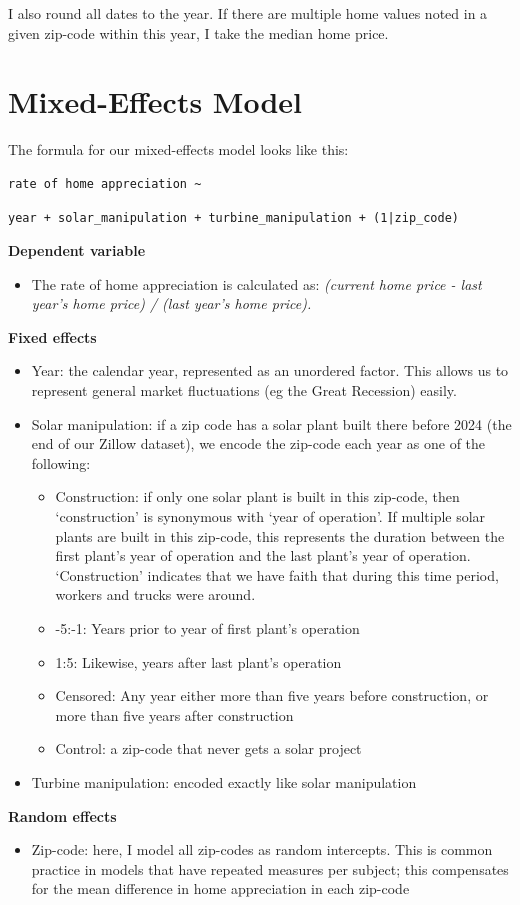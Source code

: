\documentclass{article}
\begin{document}
I also round all dates to the year.
If there are multiple home values noted in a given zip-code within this year, I take the median home price.

\section{Mixed-Effects Model}

The formula for our mixed-effects model looks like this:
\begin{verbatim}
rate of home appreciation ~ 
\end{verbatim}
\begin{verbatim}
year + solar_manipulation + turbine_manipulation + (1|zip_code)
\end{verbatim}

\textbf{Dependent variable}
\begin{itemize}
\item The rate of home appreciation is calculated as: \emph{(current home price - last year's home price) / (last year's home price).}
\end{itemize}

\textbf{Fixed effects}
\begin{itemize}
\item Year: the calendar year, represented as an unordered factor. This allows us to represent general market fluctuations (eg the Great Recession) easily.
\item Solar manipulation: if a zip code has a solar plant built there before 2024 (the end of our Zillow dataset), we encode the zip-code each year as one of the following:
	\begin{itemize}
	\item Construction: if only one solar plant is built in this zip-code, then `construction' is synonymous with `year of operation'. If multiple solar plants are built in this zip-code, this represents the duration between the first plant's year of operation and the last plant's year of operation. `Construction' indicates that we have faith that during this time period, workers and trucks were around.
	\item -5:-1: Years prior to year of first plant's operation
	\item 1:5: Likewise, years after last plant's operation
	\item Censored: Any year either more than five years before construction, or more than five years after construction
	\item Control: a zip-code that never gets a solar project
	\end{itemize}
\item Turbine manipulation: encoded exactly like solar manipulation
\end{itemize}
\textbf{Random effects}
\begin{itemize}
\item Zip-code: here, I model all zip-codes as random intercepts. This is common practice in models that have repeated measures per subject; this compensates for the mean difference in home appreciation in each zip-code
\end{itemize}
\end{document}
